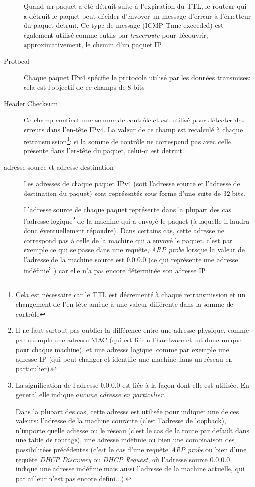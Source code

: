 \begin{description}
Quand un paquet a été détruit suite à l'expiration du TTL, le routeur qui a
détruit le paquet peut décider d'envoyer un message d'erreur à l'émetteur du
paquet détruit. Ce type de message (ICMP Time exceeded) est également utilisé comme
outils par {\it traceroute} pour découvrir, approximativement, le chemin 
d'un paquet IP.

\item [Protocol]
Chaque paquet IPv4 spécifie le protocole utilisé par les données transmises:
cela est l'objectif de ce champs de 8 bits 

\item [Header Checksum]
Ce champ contient une somme de contrôle et est utilisé pour détecter des 
erreurs dans l'en-tête IPv4. La valeur de ce champ est recalculé à
chaque retransmission\footnote {Cela est nécessaire car le TTL est décrementé
à chaque retransmission et un changement de l'en-tête amène à une valeur différente
dans la somme de contrôle}: si la somme de contrôle ne correspond pas avec celle 
présente dans l'en-tête du paquet, celui-ci est detruit.


\item [adresse source et adresse destination]
Les adresses de chaque paquet IPv4 (soit l'adresse source et l'adresse de
destination du paquet) sont représentés sous forme d'une suite de 32 bits.

L'adresse source de chaque paquet représente dans la plupart des cas
l'adresse logique\footnote {Il ne faut surtout pas oublier la différence entre
une adresse physique, comme par exemple une adresse MAC (qui est liée a
l'hardware et est donc unique pour chaque machine), et une adresse logique,
comme par exemple une adresse IP (qui peut changer et identifie une machine
dans un réseau en particulier).} de la machine qui a envoyé le paquet
(à laquelle il faudra donc éventuellement répondre).  Dans certains cas,
 cette adresse ne correspond pas à celle de la machine qui a envoyé
le paquet, c'est par exemple ce qui se passe dans une requête, {\it ARP probe}
lorsque la valeur de l'adresse de la machine source est 0.0.0.0 (ce qui représente
une adresse indéfinie\footnote {La signification de l'adresse 0.0.0.0
est liée à la façon dont elle est utilisée. En general elle indique {\it aucune
adresse en particulier}. 

Dans la plupart des cas, cette adresse est utilisée
pour indiquer une de ces valeurs: l'adresse de la machine courante (c'est
l'adresse de loopback), n'importe quelle adresse ou le réseau (c'est le cas de la
route par default dans une table de routage), une adresse indéfinie ou bien une
combinaison des possibilitées précédentes (c'est le cas d'une requête {\it ARP
probe} ou bien d'une requête {\it DHCP Discovery} ou {\it DHCP Request}, où
 l'adresse source 0.0.0.0 indique une adresse indéfinie mais aussi l'adresse
de la machine actuelle, qui par ailleur n'est pas encore defini...).}
) car elle n'a pas encore déterminée son adresse IP. 


\end{description}
